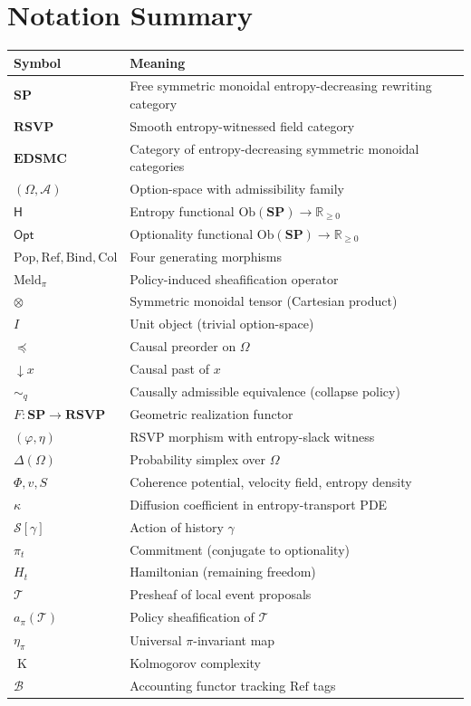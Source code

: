 \documentclass[12pt,a4paper]{article}
\theoremstyle{definition}
\theoremstyle{remark}
\newcommand{\Rnn}{\mathbb{R}_{\ge 0}}
\newcommand{\Ent}{\mathsf{H}}
\newcommand{\Opt}{\mathsf{Opt}}
\newcommand{\SP}{\mathbf{SP}}
\newcommand{\RSVP}{\mathbf{RSVP}}
\newcommand{\EDSMC}{\mathbf{EDSMC}}
\newcommand{\Ob}{\mathrm{Ob}}
\newcommand{\Pop}{\mathrm{Pop}}
\newcommand{\Ref}{\mathrm{Ref}}
\newcommand{\Bind}{\mathrm{Bind}}
\newcommand{\Col}{\mathrm{Col}}
\newcommand{\Meld}{\mathrm{Meld}}
\newcommand{\tensor}{\otimes}
\newcommand{\unit}{I}
\DeclareMathOperator{\Kc}{K}
\newcommand{\PhiF}{\Phi}
\newcommand{\vF}{v}
\newcommand{\SF}{S}
\newcommand{\downset}[1]{\!\downarrow\!{#1}}
\begin{document}
\section{Notation Summary}
\label{app:notation}

\begin{center}
\renewcommand{\arraystretch}{1.4}
\begin{tabular}{ll}
\toprule
\textbf{Symbol} & \textbf{Meaning} \\
\midrule
$\SP$ & Free symmetric monoidal entropy-decreasing rewriting category \\
$\RSVP$ & Smooth entropy-witnessed field category \\
$\EDSMC$ & Category of entropy-decreasing symmetric monoidal categories \\
$(\Omega,\mathcal{A})$ & Option-space with admissibility family \\
$\Ent$ & Entropy functional $\Ob(\SP)\to\Rnn$ \\
$\Opt$ & Optionality functional $\Ob(\SP)\to\Rnn$ \\
$\Pop,\Ref,\Bind,\Col$ & Four generating morphisms \\
$\Meld_\pi$ & Policy-induced sheafification operator \\
$\tensor$ & Symmetric monoidal tensor (Cartesian product) \\
$\unit$ & Unit object (trivial option-space) \\
$\preceq$ & Causal preorder on $\Omega$ \\
$\downset{x}$ & Causal past of $x$ \\
$\sim_q$ & Causally admissible equivalence (collapse policy) \\
$F:\SP\to\RSVP$ & Geometric realization functor \\
$(\varphi,\eta)$ & RSVP morphism with entropy-slack witness \\
$\Delta(\Omega)$ & Probability simplex over $\Omega$ \\
$\PhiF,\vF,\SF$ & Coherence potential, velocity field, entropy density \\
$\kappa$ & Diffusion coefficient in entropy-transport PDE \\
$\mathcal{S}[\gamma]$ & Action of history $\gamma$ \\
$\pi_t$ & Commitment (conjugate to optionality) \\
$H_t$ & Hamiltonian (remaining freedom) \\
$\mathcal{T}$ & Presheaf of local event proposals \\
$a_\pi(\mathcal{T})$ & Policy sheafification of $\mathcal{T}$ \\
$\eta_\pi$ & Universal $\pi$-invariant map \\
$\Kc$ & Kolmogorov complexity \\
$\mathcal{B}$ & Accounting functor tracking $\Ref$ tags \\
\bottomrule
\end{tabular}
\end{center}
\end{document}
